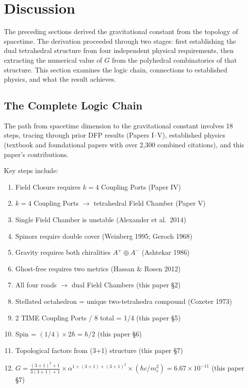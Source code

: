 \documentclass[aps,prd,preprint,superscriptaddress,showpacs,preprintnumbers,amsmath,amssymb,nofootinbib]{revtex4-2}
\begin{document}
\section{Discussion}
\label{sec:discussion}

The preceding sections derived the gravitational constant from the topology of spacetime. The derivation proceeded through two stages: first establishing the dual tetrahedral structure from four independent physical requirements, then extracting the numerical value of $G$ from the polyhedral combinatorics of that structure. This section examines the logic chain, connections to established physics, and what the result achieves.

\subsection{The Complete Logic Chain}
\label{subsec:logic-chain}

The path from spacetime dimension to the gravitational constant involves 18 steps, tracing through prior DFP results (Papers I--V), established physics (textbook and foundational papers with over 2,300 combined citations), and this paper's contributions.

Key steps include:
\begin{enumerate}
\item Field Closure requires $k=4$ Coupling Ports (Paper IV)
\item $k=4$ Coupling Ports $\rightarrow$ tetrahedral Field Chamber (Paper V)
\item Single Field Chamber is unstable (Alexander et al.\ 2014)
\item Spinors require double cover (Weinberg 1995; Geroch 1968)
\item Gravity requires both chiralities $A^+ \oplus A^-$ (Ashtekar 1986)
\item Ghost-free requires two metrics (Hassan \& Rosen 2012)
\item All four roads $\rightarrow$ dual Field Chambers (this paper \S2)
\item Stellated octahedron = unique two-tetrahedra compound (Coxeter 1973)
\item 2 TIME Coupling Ports / 8 total = 1/4 (this paper \S5)
\item Spin = $(1/4) \times 2\hbar = \hbar/2$ (this paper \S6)
\item Topological factors from (3+1) structure (this paper \S7)
\item $G = \frac{(3+1)^2+1}{3(3+1)+1} \times \alpha^{1+(3+1)+(3+1)^2} \times (\hbar c/m_e^2) = 6.67 \times 10^{-11}$ (this paper \S7)
\end{enumerate}
\end{document}

